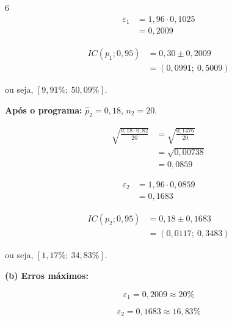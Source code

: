 \documentclass[8pt, a4paper, landscape]{extarticle}
\begin{document}
\begin{multicols}{6}
\begin{equation*}
\begin{split}
\varepsilon_1 &= 1,96 \cdot 0,1025 \\
&= 0,2009
\end{split}
\end{equation*}

\begin{equation*}
\begin{split}
IC(p_1;0,95) &= 0,30 \pm 0,2009 \\
&= (0,0991;\ 0,5009)
\end{split}
\end{equation*}

ou seja, $[9,91\%;\ 50,09\%]$.

\vspace{0.2cm}

\textbf{Após o programa:} $\hat{p}_2 = 0,18$, $n_2 = 20$.

\begin{equation*}
\begin{split}
\sqrt{\frac{0,18 \cdot 0,82}{20}} &= \sqrt{\frac{0,1476}{20}} \\
&= \sqrt{0,00738} \\
&= 0,0859
\end{split}
\end{equation*}

\begin{equation*}
\begin{split}
\varepsilon_2 &= 1,96 \cdot 0,0859 \\
&= 0,1683
\end{split}
\end{equation*}

\begin{equation*}
\begin{split}
IC(p_2;0,95) &= 0,18 \pm 0,1683 \\
&= (0,0117;\ 0,3483)
\end{split}
\end{equation*}

ou seja, $[1,17\%;\ 34,83\%]$.

\vspace{0.2cm}

\textbf{(b) Erros máximos:}

\begin{equation*}
\varepsilon_1 = 0,2009 \approx 20\%
\end{equation*}

\begin{equation*}
\varepsilon_2 = 0,1683 \approx 16,83\%
\end{equation*}


\end{multicols}
\end{document}
